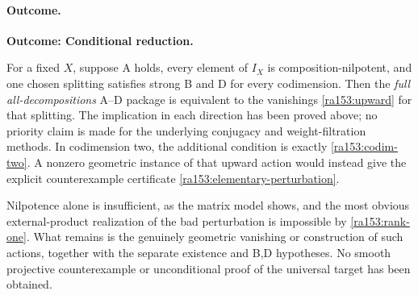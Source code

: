 \documentclass[11pt]{article}
\begin{document}
\paragraph{Outcome.}
\textbf{Outcome: Conditional reduction.}

For a fixed $X$, suppose A holds, every element of $I_X$ is composition-nilpotent,
and one chosen splitting satisfies strong B and D for every codimension.
Then the \emph{full all-decompositions} A--D package is equivalent to the
vanishings \eqref{ra153:upward} for that splitting.  The implication in each
direction has been proved above; no priority claim is made for the underlying
conjugacy and weight-filtration methods.  In codimension two, the additional
condition is exactly \eqref{ra153:codim-two}.  A nonzero geometric instance of
that upward action would instead give the explicit counterexample certificate
\eqref{ra153:elementary-perturbation}.

Nilpotence alone is insufficient, as the matrix model shows, and the most
obvious external-product realization of the bad perturbation is impossible
by \eqref{ra153:rank-one}.  What remains is the genuinely geometric vanishing
or construction of such actions, together with the separate existence and
B,D hypotheses.  No smooth projective counterexample or unconditional proof
of the universal target has been obtained.
\end{document}
